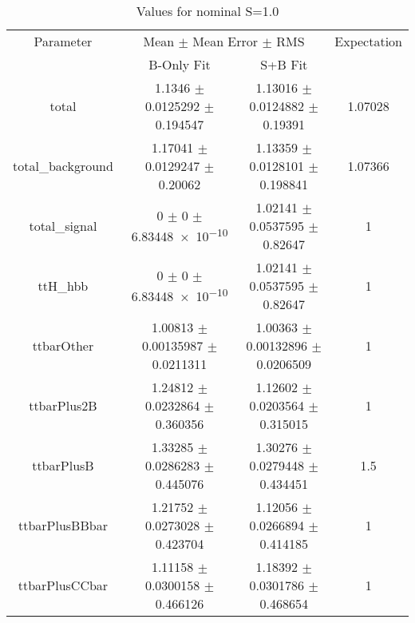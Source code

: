 \begin{table}
\centering
\caption{Values for nominal S=1.0}
\begin{tabular}{cccc}
\toprule
Parameter & \multicolumn{2}{c}{Mean $\pm$ Mean Error $\pm$ RMS} & Expectation\\
 & B-Only Fit & S+B Fit & \\
\midrule
total & \num{1.1346} $\pm$ \num{0.0125292} $\pm$ \num{0.194547} & \num{1.13016} $\pm$ \num{0.0124882} $\pm$ \num{0.19391} & \num{1.07028}\\
total\_background & \num{1.17041} $\pm$ \num{0.0129247} $\pm$ \num{0.20062} & \num{1.13359} $\pm$ \num{0.0128101} $\pm$ \num{0.198841} & \num{1.07366}\\
total\_signal & \num{0} $\pm$ \num{0} $\pm$ \num{6.83448e-10} & \num{1.02141} $\pm$ \num{0.0537595} $\pm$ \num{0.82647} & \num{1}\\
ttH\_hbb & \num{0} $\pm$ \num{0} $\pm$ \num{6.83448e-10} & \num{1.02141} $\pm$ \num{0.0537595} $\pm$ \num{0.82647} & \num{1}\\
ttbarOther & \num{1.00813} $\pm$ \num{0.00135987} $\pm$ \num{0.0211311} & \num{1.00363} $\pm$ \num{0.00132896} $\pm$ \num{0.0206509} & \num{1}\\
ttbarPlus2B & \num{1.24812} $\pm$ \num{0.0232864} $\pm$ \num{0.360356} & \num{1.12602} $\pm$ \num{0.0203564} $\pm$ \num{0.315015} & \num{1}\\
ttbarPlusB & \num{1.33285} $\pm$ \num{0.0286283} $\pm$ \num{0.445076} & \num{1.30276} $\pm$ \num{0.0279448} $\pm$ \num{0.434451} & \num{1.5}\\
ttbarPlusBBbar & \num{1.21752} $\pm$ \num{0.0273028} $\pm$ \num{0.423704} & \num{1.12056} $\pm$ \num{0.0266894} $\pm$ \num{0.414185} & \num{1}\\
ttbarPlusCCbar & \num{1.11158} $\pm$ \num{0.0300158} $\pm$ \num{0.466126} & \num{1.18392} $\pm$ \num{0.0301786} $\pm$ \num{0.468654} & \num{1}\\
\bottomrule
\end{tabular}
\end{table}